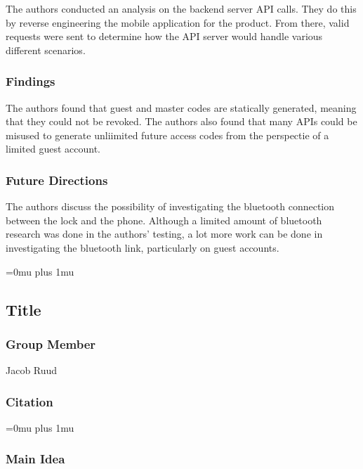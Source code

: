 \noindent
The authors conducted an analysis on the backend server API calls.  They do this by reverse engineering the mobile application for the product.  From there, valid requests were sent to determine how the API server would handle various different scenarios.

\subsubsection{Findings}

\noindent
The authors found that guest and master codes are statically generated, meaning that they could not be revoked.  The authors also found that many APIs could be misused to generate unliimited future access codes from the perspectie of a limited guest account.

\subsubsection{Future Directions}

\noindent
The authors discuss the possibility of investigating the bluetooth connection between the lock and the phone.  Although a limited amount of bluetooth research was done in the authors' testing, a lot more work can be done in investigating the bluetooth link, particularly on guest accounts.

\Urlmuskip=0mu plus 1mu\relax

\noindent
\subsection{Title}

\subsubsection{Group Member}

\noindent
Jacob Ruud

\noindent
\subsubsection{Citation}

\Urlmuskip=0mu plus 1mu\relax

\subsubsection{Main Idea}

